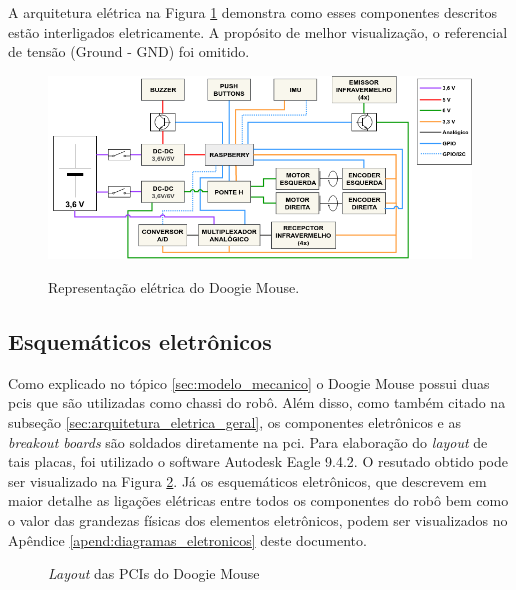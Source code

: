 A arquitetura elétrica na Figura \ref{fig:arquitetura_eletrica} demonstra como esses componentes descritos estão interligados eletricamente. A propósito de melhor visualização, o referencial de tensão (Ground - GND) foi omitido.

\begin{figure}[H]
	\centering
	\caption{Representação elétrica do Doogie Mouse.}
	\includegraphics[width=1\textwidth]
	{Figures/arquitetura_eletrica}
	\label{fig:arquitetura_eletrica}
\end{figure}

\subsection{Esquemáticos eletrônicos}
\label{ssec:esquematicos_eletronicos}
Como explicado no tópico \ref{sec:modelo_mecanico} o Doogie Mouse possui duas \glspl*{pci} que são utilizadas como chassi do robô. Além disso, como também citado na subseção \ref{sec:arquitetura_eletrica_geral}, os componentes eletrônicos e as \textit{breakout boards} são soldados diretamente na \gls*{pci}. Para elaboração do \textit{layout} de tais placas, foi utilizado o software Autodesk Eagle 9.4.2. O resutado obtido pode ser visualizado na Figura \ref{fig:doogie_boards}. Já os esquemáticos eletrônicos, que descrevem em maior detalhe as ligações elétricas entre todos os componentes do robô bem como o valor das grandezas físicas dos elementos eletrônicos, podem ser visualizados no Apêndice \ref{apend:diagramas_eletronicos} deste documento.

\begin{figure}[H]
	\centering
	\caption{\textit{Layout} das PCIs do Doogie Mouse}
	\label{fig:doogie_boards}
\end{figure}

